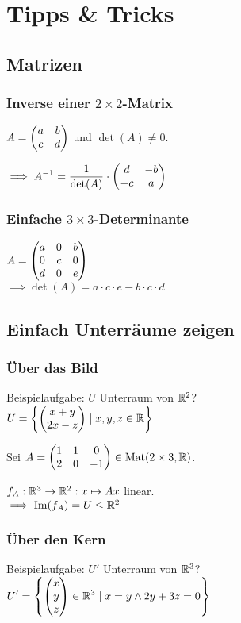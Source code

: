 \section*{Tipps \& Tricks}

\subsection*{Matrizen}

\subsubsection*{Inverse einer $2\times2$-Matrix}
$A=\begin{pmatrix} a & b \\ c & d \end{pmatrix}$ und $\det(A) \neq 0$.

$\displaystyle \implies A^{-1} = \frac{1}{\det(A)}\cdot\begin{pmatrix} d & -b \\ -c & a \end{pmatrix}$

\subsubsection*{Einfache $3\times3$-Determinante}
$A=\begin{pmatrix} a & 0 & b \\ 0 & c & 0 \\ d & 0 & e \end{pmatrix}$ \\
$\implies \det(A)=a\cdot c \cdot e - b \cdot c \cdot d$

\subsection*{Einfach Unterräume zeigen}

\subsubsection*{Über das Bild}
Beispielaufgabe: $U$ Unterraum von $\mathbb{R}^2$? \\
$\displaystyle U=\left\{\begin{pmatrix} x+y \\ 2x-z \end{pmatrix} \mid x,y,z\in\mathbb{R} \right\}$

Sei $\displaystyle A=\begin{pmatrix} 1 & 1 & 0 \\ 2 & 0 & -1 \end{pmatrix} \in\operatorname{Mat}(2 \times 3, \mathbb{R})$.

$f_A: \mathbb{R}^3 \to \mathbb{R}^2: x \mapsto Ax$ linear. \\
$\implies \operatorname{Im}(f_A)=U \le \mathbb{R}^2$

\subsubsection*{Über den Kern}
Beispielaufgabe: $U'$ Unterraum von $\mathbb{R}^3$? \\
$\displaystyle U'=\left\{\begin{pmatrix} x\\y\\z \end{pmatrix}\in\mathbb{R}^3 \mid x=y \land 2y+3z=0\right\}$

